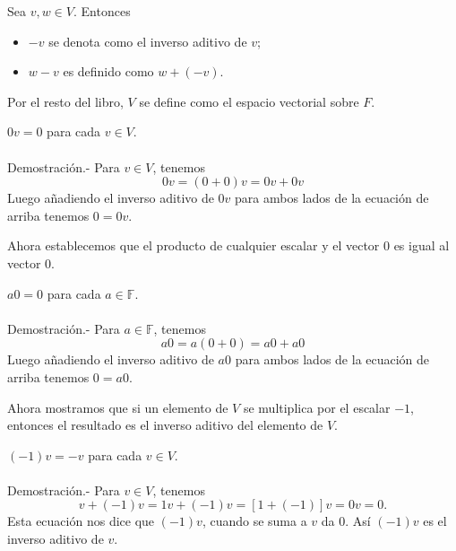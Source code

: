 \begin{tcolorbox}[colback=white]
    \begin{nota}[$-v,w-v$]
	Sea $v,w \in V$. Entonces
	\begin{itemize}
	    \item $-v$ se denota como el inverso aditivo de $v$;
	    \item $w-v$ es definido como $w+(-v)$.
	\end{itemize}
    \end{nota}
\end{tcolorbox}

\begin{tcolorbox}[colback=white]
    \begin{nota}[$V$]
	Por el resto del libro, $V$ se define como el espacio vectorial sobre $F$.
    \end{nota}
\end{tcolorbox}

\begin{teo}
    $0v=0$ para cada $v\in V$.\\\\
	Demostración.-\; Para $v\in V$, tenemos
	$$0v=(0+0)v=0v+0v$$
	Luego añadiendo el inverso aditivo de $0v$ para ambos lados de la ecuación de arriba tenemos $0=0v$.\\

\end{teo}

Ahora  establecemos que el producto de cualquier escalar y el vector $0$ es igual al vector $0$.\\

\begin{teo}
    $a0=0$ para cada $a\in \mathbb{F}$.\\\\
	Demostración.-\; Para $a\in \mathbb{F}$, tenemos 
	$$a0=a(0+0)=a0+a0$$
	Luego añadiendo el inverso aditivo de $a0$ para ambos lados de la ecuación de arriba tenemos $0=a0$.\\
\end{teo}

Ahora mostramos que si un elemento de $V$ se multiplica por el escalar $-1$, entonces el resultado es el inverso aditivo del elemento de $V$.\\
\begin{teo}
    $(-1)v=-v$ para cada $v\in V$.\\\\
    	Demostración.-\; Para $v\in V$, tenemos
	$$v+(-1)v=1v+(-1)v=[1+(-1)]v=0v=0.$$
	Esta ecuación nos dice que $(-1)v$, cuando se suma a $v$ da $0$. Así $(-1)v$ es el inverso aditivo de $v$.\\
\end{teo}


